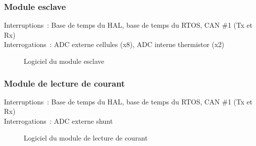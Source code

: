 	\subsubsection*{Module esclave}
		\noindent
		Interruptions : Base de temps du HAL, base de temps du RTOS, CAN \#1 (Tx et Rx) \\
		Interrogations : ADC externe cellules (x8), ADC interne thermistor (x2)
		\begin{figure}[H]
			\centering
			\caption{Logiciel du module esclave}
			\label{fig:logiciel_slave}
		\end{figure}

	\newpage
	\subsubsection*{Module de lecture de courant}
		\noindent
		Interruptions : Base de temps du HAL, base de temps du RTOS, CAN \#1 (Tx et Rx) \\
		Interrogations : ADC externe shunt
		\begin{figure}[H]
			\centering
			\caption{Logiciel du module de lecture de courant}
			\label{fig:logiciel_current_sense}
		\end{figure}
